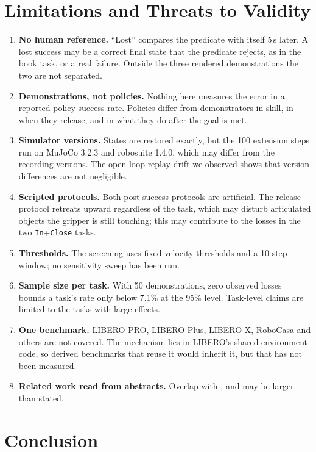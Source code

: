\documentclass[10pt,twocolumn]{article}
\newcommand{\pred}[1]{\texttt{#1}}
\begin{document}
\section{Limitations and Threats to Validity}
\label{sec:limits}

\begin{enumerate}
\item \textbf{No human reference.} ``Lost'' compares the predicate with itself 5\,s later. A lost success may be a correct final state that the predicate rejects, as in the book task, or a real failure. Outside the three rendered demonstrations the two are not separated.
\item \textbf{Demonstrations, not policies.} Nothing here measures the error in a reported policy success rate. Policies differ from demonstrators in skill, in when they release, and in what they do after the goal is met.
\item \textbf{Simulator versions.} States are restored exactly, but the 100 extension steps run on MuJoCo 3.2.3 and robosuite 1.4.0, which may differ from the recording versions. The open-loop replay drift we observed shows that version differences are not negligible.
\item \textbf{Scripted protocols.} Both post-success protocols are artificial. The release protocol retreats upward regardless of the task, which may disturb articulated objects the gripper is still touching; this may contribute to the losses in the two \pred{In}+\pred{Close} tasks.
\item \textbf{Thresholds.} The screening uses fixed velocity thresholds and a 10-step window; no sensitivity sweep has been run.
\item \textbf{Sample size per task.} With 50 demonstrations, zero observed losses bounds a task's rate only below 7.1\% at the 95\% level. Task-level claims are limited to the tasks with large effects.
\item \textbf{One benchmark.} LIBERO-PRO, LIBERO-Plus, LIBERO-X, RoboCasa and others are not covered. The mechanism lies in LIBERO's shared environment code, so derived benchmarks that reuse it would inherit it, but that has not been measured.
\item \textbf{Related work read from abstracts.} Overlap with \cite{wang2026liberox}, \cite{valle2026mango} and \cite{zhou2026simuguard} may be larger than stated.
\end{enumerate}

\section{Conclusion}
\end{document}
